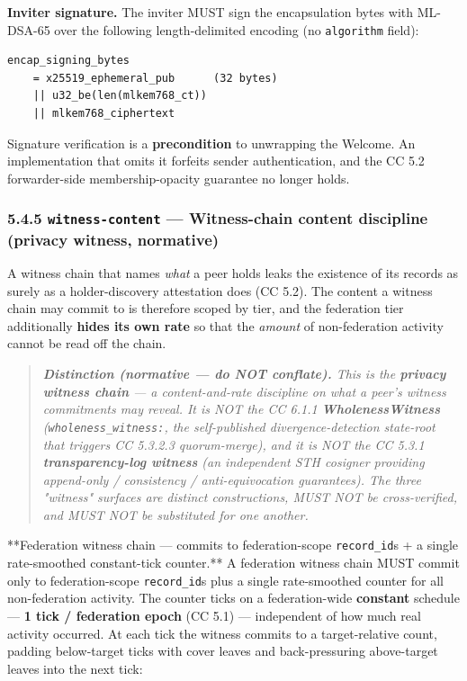 \documentclass[11pt]{article}
\begin{document}
\textbf{Inviter signature.} The inviter MUST sign the encapsulation bytes with ML-DSA-65 over the following length-delimited encoding (no \texttt{algorithm} field):


\begin{lstlisting}
encap_signing_bytes
    = x25519_ephemeral_pub      (32 bytes)
    || u32_be(len(mlkem768_ct))
    || mlkem768_ciphertext
\end{lstlisting}

Signature verification is a \textbf{precondition} to unwrapping the Welcome. An implementation that omits it forfeits sender authentication, and the CC 5.2 forwarder-side membership-opacity guarantee no longer holds.


\subsubsection*{5.4.5 \texttt{witness-content} — Witness-chain content discipline (privacy witness, normative)}


A witness chain that names \textit{what} a peer holds leaks the existence of its records as surely as a holder-discovery attestation does (CC 5.2). The content a witness chain may commit to is therefore scoped by tier, and the federation tier additionally \textbf{hides its own rate} so that the \textit{amount} of non-federation activity cannot be read off the chain.


\begin{quote}\itshape \textbf{Distinction (normative — do NOT conflate).} This is the \textbf{privacy witness chain} — a content-and-rate discipline on what a peer's witness commitments may reveal. It is NOT the CC 6.1.1 \textbf{WholenessWitness} (\texttt{wholeness\_witness:}, the self-published divergence-detection state-root that triggers CC 5.3.2.3 quorum-merge), and it is NOT the CC 5.3.1 \textbf{transparency-log witness} (an independent STH cosigner providing append-only / consistency / anti-equivocation guarantees). The three "witness" surfaces are distinct constructions, MUST NOT be cross-verified, and MUST NOT be substituted for one another.\end{quote}


**Federation witness chain — commits to federation-scope \texttt{record\_id}s + a single rate-smoothed constant-tick counter.** A federation witness chain MUST commit only to federation-scope \texttt{record\_id}s plus a single rate-smoothed counter for all non-federation activity. The counter ticks on a federation-wide \textbf{constant} schedule — \textbf{1 tick / federation epoch} (CC 5.1) — independent of how much real activity occurred. At each tick the witness commits to a target-relative count, padding below-target ticks with cover leaves and back-pressuring above-target leaves into the next tick:
\end{document}
